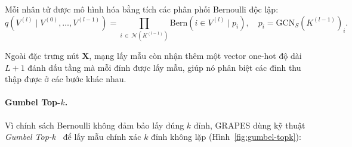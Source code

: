 Mỗi nhân tử được mô hình hóa bằng tích các phân phối Bernoulli độc lập:
\begin{equation}
q\!\left(V^{(l)}\mid V^{(0)},\ldots,V^{(l-1)}\right)
= \prod_{i\,\in\,\mathcal{N}(K^{(l-1)})} \mathrm{Bern}\!\left(i \in V^{(l)}\mid p_i\right),
\quad p_i = \text{GCN}_S\!\left(K^{(l-1)}\right)_i.
\end{equation}

Ngoài đặc trưng nút $\mathbf{X}$, mạng lấy mẫu còn nhận thêm một vector one-hot độ dài $L+1$ đánh dấu tầng mà mỗi đỉnh được lấy mẫu, giúp nó phân biệt các đỉnh thu thập được ở các bước khác nhau.

\paragraph{Gumbel Top-$k$.} Vì chính sách Bernoulli không đảm bảo lấy đúng $k$ đỉnh, GRAPES dùng kỹ thuật \textit{Gumbel Top-$k$}~\cite{Younesian2023GRAPES} để lấy mẫu chính xác $k$ đỉnh không lặp (Hình~\ref{fig:gumbel-topk}):

